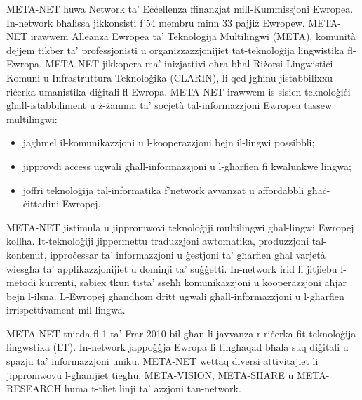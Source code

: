 \documentclass[]{../../metanetpaper}
\begin{document}
\cleardoublepage



\begin{multicols}{2}

META-NET huwa Network ta’ Eċċellenza ffinanzjat mill-Kummissjoni Ewropea. In-network bħalissa jikkonsisti f’54 membru minn 33 pajjiż Ewropew. META-NET irawwem Alleanza Ewropea ta’ Teknoloġija Multilingwi (META), komunità dejjem tikber ta’ professjonisti u organizzazzjonijiet tat-teknoloġija lingwistika fl-Ewropa.  META-NET jikkopera ma’ inizjattivi oħra bħal Riżorsi Lingwistiċi Komuni u Infrastruttura Teknoloġika (CLARIN), li qed jgħinu jistabbilixxu riċerka umanistika diġitali fl-Ewropa. META-NET irawwem is-sisien teknoloġiċi għall-istabbiliment u ż-żamma ta’ soċjetà tal-informazzjoni Ewropea tassew multilingwi:

\begin{itemize}
\item jagħmel il-komunikazzjoni u l-kooperazzjoni bejn il-lingwi possibbli;
\item jipprovdi aċċess ugwali għall-informazzjoni u l-għarfien fi kwalunkwe lingwa;
\item joffri teknoloġija tal-informatika f’network avvanzat u affordabbli  għaċ-ċittadini Ewropej.  
\end{itemize}

META-NET jistimula u jippromwovi teknoloġiji multilingwi għal-lingwi Ewropej kollha. It-teknoloġiji jippermettu traduzzjoni awtomatika, produzzjoni tal-kontenut, ipproċessar ta’ informazzjoni u ġestjoni ta’ għarfien għal varjetà wiesgħa ta’ applikazzjonijiet u dominji ta’ suġġetti. In-network irid li jitjiebu l-metodi kurrenti, sabiex tkun tista’ sseħħ komunikazzjoni u kooperazzjoni aħjar bejn l-ilsna. L-Ewropej għandhom dritt ugwali għall-informazzjoni u l-għarfien irrispettivament mil-lingwa.

META-NET tnieda fl-1 ta’ Frar 2010 bil-għan li javvanza r-riċerka fit-teknoloġija lingwstika (LT). In-network jappoġġja Ewropa li tingħaqad bħala suq diġitali u spazju ta’ informazzjoni uniku. META-NET wettaq diversi attivitajiet li jippromwovu l-għanijiet tiegħu. META-VISION, META-SHARE u META-RESEARCH huma t-tliet linji ta’ azzjoni tan-network.  


\end{multicols}
\end{document}
